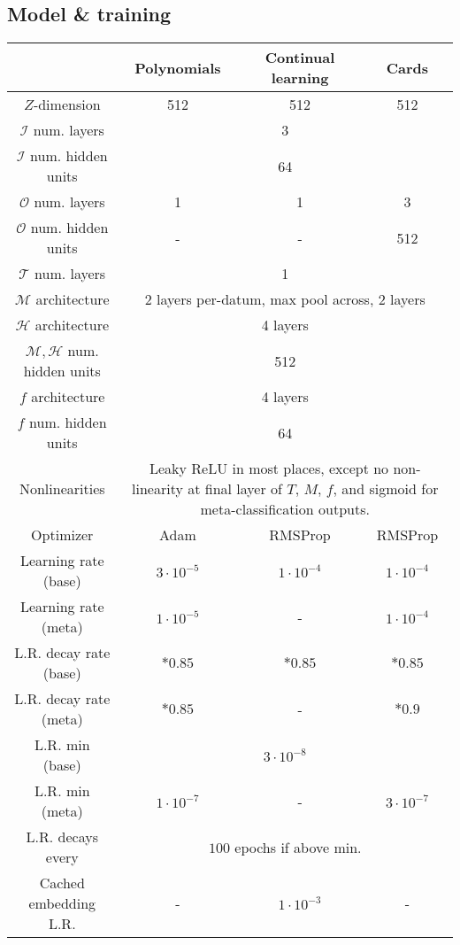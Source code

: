 \documentclass{article}
\begin{document}
\subsection{Model \& training}
\begin{table}
\centering
\begin{tabular}{|c|ccc|}
\hline 
& \phantom{bla}Polynomials\phantom{la} & Continual learning & \phantom{blahb}Cards\phantom{blahb} \\
\hline
$Z$-dimension & 512 & 512 & 512 \\
$\mathcal{I}$ num. layers & \multicolumn{3}{c|}{3} \\ 
$\mathcal{I}$ num. hidden units & \multicolumn{3}{c|}{64} \\ 
$\mathcal{O}$ num. layers & 1 & 1 & 3 \\ 
$\mathcal{O}$ num. hidden units & - & - & 512 \\ 
$\mathcal{T}$ num. layers & \multicolumn{3}{c|}{1} \\ 
$\mathcal{M}$ architecture & \multicolumn{3}{c|}{2 layers per-datum, max pool across, 2 layers} \\ 
$\mathcal{H}$ architecture & \multicolumn{3}{c|}{4 layers} \\ 
$\mathcal{M}, \mathcal{H}$ num. hidden units & \multicolumn{3}{c|}{512} \\ 
$f$ architecture & \multicolumn{3}{c|}{4 layers} \\ 
$f$ num. hidden units & \multicolumn{3}{c|}{64} \\ 
Nonlinearities & \multicolumn{3}{p{8.5cm}|}{Leaky ReLU in most places, except no non-linearity at final layer of $T$, $M$, $f$, and sigmoid for meta-classification outputs.} \\
\hline
Optimizer & Adam & RMSProp & RMSProp \\
Learning rate (base) & $3\cdot 10^{-5}$ & $1\cdot 10^{-4}$ & $1\cdot 10^{-4}$\\
Learning rate (meta) & $1\cdot 10^{-5}$ & - & $1\cdot 10^{-4}$\\
L.R. decay rate (base) & $*0.85$ & $*0.85$ & $*0.85$ \\
L.R. decay rate (meta) & $*0.85$ & - & $*0.9$ \\
L.R. min (base) & \multicolumn{3}{c|}{$3 \cdot 10^{-8}$} \\
L.R. min (meta) & $1 \cdot 10^{-7}$& - & $3 \cdot 10^{-7}$ \\
L.R. decays every & \multicolumn{3}{c|}{$100$ epochs if above min.} \\
Cached embedding L.R. & - & $1\cdot 10^{-3}$ & -\\

\end{tabular}
\end{table}
\end{document}

